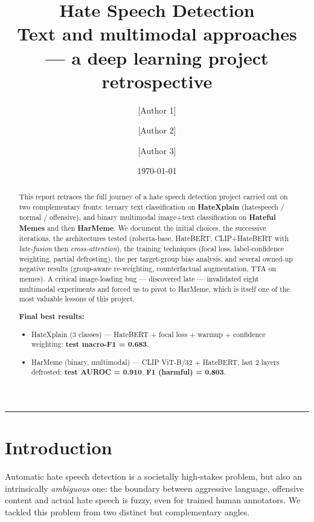 \documentclass[11pt,a4paper]{article}
\title{\textbf{Hate Speech Detection}\\
\large Text and multimodal approaches --- a deep learning project retrospective}
\author{[Author 1] \and [Author 2] \and [Author 3]}
\date{\today}
\begin{document}
\maketitle

\begin{abstract}
\noindent
This report retraces the full journey of a hate speech detection project carried out
on two complementary fronts: ternary text classification on \textbf{HateXplain}
(hatespeech / normal / offensive), and binary multimodal image+text classification
on \textbf{Hateful Memes} and then \textbf{HarMeme}. We document the initial choices,
the successive iterations, the architectures tested (roberta-base, HateBERT,
CLIP+HateBERT with \emph{late-fusion} then \emph{cross-attention}), the training
techniques (focal loss, label-confidence weighting, partial defrosting), the per
target-group bias analysis, and several owned-up negative results (group-aware
re-weighting, counterfactual augmentation, TTA on memes). A critical image-loading
bug --- discovered late --- invalidated eight multimodal experiments and forced us
to pivot to HarMeme, which is itself one of the most valuable lessons of this project.

\medskip
\noindent\textbf{Final best results:}
\begin{itemize}[leftmargin=*]
    \item HateXplain (3 classes) --- HateBERT + focal loss + warmup + confidence
    weighting: \textbf{test macro-F1 = 0.683}.
    \item HarMeme (binary, multimodal) --- CLIP ViT-B/32 + HateBERT, last 2 layers
    defrosted: \textbf{test AUROC = 0.910}, \textbf{F1 (harmful) = 0.803}.
\end{itemize}
\end{abstract}

\tableofcontents
\vspace{1em}
\hrule

\section{Introduction}

Automatic hate speech detection is a societally high-stakes problem, but also an
intrinsically \emph{ambiguous} one: the boundary between aggressive language,
offensive content and actual hate speech is fuzzy, even for trained human
annotators. We tackled this problem from two distinct but complementary angles.
\end{document}
